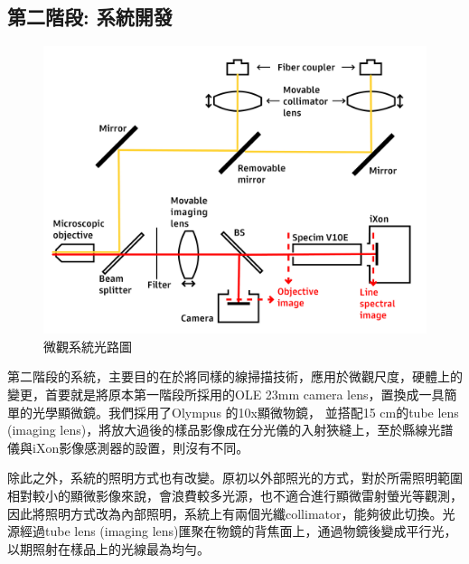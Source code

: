 \documentclass[12pt]{article}
\begin{document}
\subsection{第二階段: 系統開發}
\begin{figure}
    \centering
    \includegraphics[width = 0.9\linewidth]{lightPath2.jpg}
    \caption{微觀系統光路圖}
    \label{fig: micro path}
\end{figure}
第二階段的系統，主要目的在於將同樣的線掃描技術，應用於微觀尺度，硬體上的變更，首要就是將原本第一階段所採用的OLE 23mm camera lens，置換成一具簡單的光學顯微鏡。我們採用了Olympus 的10x顯微物鏡，
並搭配15 cm的tube lens (imaging lens)，將放大過後的樣品影像成在分光儀的入射狹縫上，至於縣線光譜儀與iXon影像感測器的設置，則沒有不同。

除此之外，系統的照明方式也有改變。原初以外部照光的方式，對於所需照明範圍相對較小的顯微影像來說，會浪費較多光源，也不適合進行顯微雷射螢光等觀測，
因此將照明方式改為內部照明，系統上有兩個光纖collimator，能夠彼此切換。光源經過tube lens (imaging lens)匯聚在物鏡的背焦面上，通過物鏡後變成平行光，以期照射在樣品上的光線最為均勻。
\end{document}
